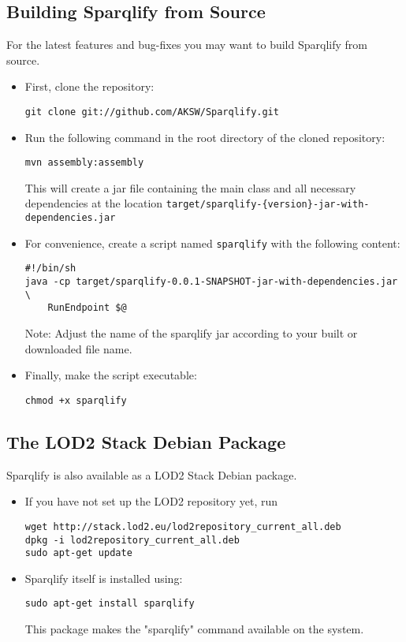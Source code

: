 \documentclass[a4paper,twoside,bibtotoc,abstracton,12pt,BCOR=15mm]{scrreprt}
\begin{document}
\subsection{Building Sparqlify from Source}
For the latest features and bug-fixes you may want to build Sparqlify from source.
\begin{itemize}
\item First, clone the repository:
\begin{lstlisting}
git clone git://github.com/AKSW/Sparqlify.git
\end{lstlisting}

\item Run the following command in the root directory of the cloned repository:
\begin{lstlisting}
mvn assembly:assembly
\end{lstlisting}
This will create a jar file containing the main class and all necessary dependencies at the location \texttt{target/sparqlify-\{version\}-jar-with-dependencies.jar}

\item For convenience, create a script named \texttt{sparqlify} with the following content:
\begin{lstlisting}
#!/bin/sh
java -cp target/sparqlify-0.0.1-SNAPSHOT-jar-with-dependencies.jar \
    RunEndpoint $@
\end{lstlisting}
Note: Adjust the name of the sparqlify jar according to your built or downloaded file name.

\item Finally, make the script executable:
\begin{lstlisting}
chmod +x sparqlify
\end{lstlisting}
\end{itemize}

\subsection{The LOD2 Stack Debian Package}
Sparqlify is also available as a LOD2 Stack Debian package.
\begin{itemize}
\item If you have not set up the LOD2 repository yet, run
\begin{lstlisting}
wget http://stack.lod2.eu/lod2repository_current_all.deb
dpkg -i lod2repository_current_all.deb
sudo apt-get update
\end{lstlisting}

\item Sparqlify itself is installed using:
\begin{lstlisting}
sudo apt-get install sparqlify
\end{lstlisting}
This package makes the "sparqlify" command available on the system.
\end{itemize}
 
\end{document}
